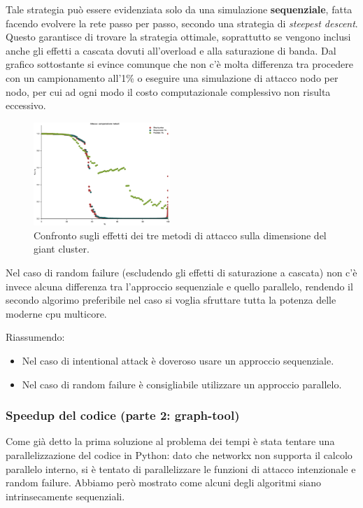 Tale strategia può essere evidenziata solo da una simulazione \textbf{sequenziale}, fatta facendo evolvere la rete passo per passo, secondo una strategia di \emph{steepest descent}. Questo garantisce di trovare la strategia ottimale, soprattutto se vengono inclusi anche gli effetti a cascata dovuti all'overload e alla saturazione di banda. Dal grafico sottostante si evince comunque che non c'è molta differenza tra procedere con un campionamento all'1\% o eseguire una simulazione di attacco nodo per nodo, per cui ad ogni modo il costo computazionale complessivo non risulta eccessivo.

\begin{figure}[p!]
	\centering
	\includegraphics[width=0.46\textwidth]{./Immagini/Attack/AttackGC_Compare}
	\caption[Confronto metodi.]{Confronto sugli effetti dei tre metodi di attacco sulla dimensione del giant cluster.}
	\label{fig:compattack}
\end{figure}

Nel caso di random failure (escludendo gli effetti di saturazione a cascata) non c'è invece alcuna differenza tra l'approccio sequenziale e quello parallelo, rendendo il secondo algorimo preferibile nel caso si voglia sfruttare tutta la potenza delle moderne cpu multicore.

Riassumendo:
\begin{itemize}
 \item Nel caso di intentional attack è doveroso usare un approccio sequenziale. 
 \item Nel caso di random failure è consigliabile utilizzare un approccio parallelo.
\end{itemize}

\subsubsection{Speedup del codice (parte 2: graph-tool)}
Come già detto la prima soluzione al problema dei tempi è stata tentare una parallelizzazione del codice in Python: dato che networkx non supporta il calcolo parallelo interno, si è tentato di parallelizzare le funzioni di attacco intenzionale e random failure. Abbiamo però mostrato come alcuni degli algoritmi siano intrinsecamente sequenziali.

